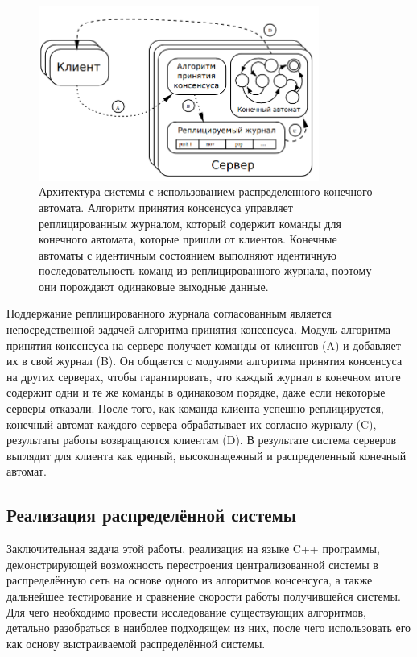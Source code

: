 \documentclass[subf, href, colorlinks=true, 14pt,
times, mtpro, specialist]{disser}
\theoremstyle{definition}
\begin{document}
\vspace{-0cm}
\begin{figure}[H]
\centering
\includegraphics[width=0.82\textwidth]{src/pics/state_machine.png}
\caption{Архитектура системы с использованием распределенного конечного автомата. Алгоритм принятия консенсуса управляет реплицированным журналом, который содержит команды для конечного автомата, которые пришли от клиентов. Конечные автоматы с идентичным состоянием выполняют идентичную последовательность команд из реплицированного журнала, поэтому они порождают одинаковые выходные данные.}
\label{fig:state_machine}
\end{figure}

Поддержание реплицированного журнала согласованным является непосредственной задачей алгоритма принятия консенсуса. Модуль алгоритма принятия консенсуса на сервере получает команды от клиентов
(A) и добавляет их в свой журнал (B). Он общается с модулями алгоритма принятия консенсуса на других серверах, чтобы гарантировать, что каждый журнал в конечном итоге содержит одни и те же команды в
одинаковом порядке, даже если некоторые серверы отказали. После того, как команда клиента успешно реплицируется, конечный автомат каждого сервера обрабатывает их согласно журналу (C), результаты работы возвращаются клиентам (D). В результате система серверов выглядит для клиента как единый, высоконадежный и распределенный конечный автомат.

\subsection{Реализация распределённой системы}

Заключительная задача этой работы, реализация на языке C++ программы, демонстрирующей возможность перестроения централизованной системы в распределённую сеть на основе одного из алгоритмов консенсуса, а также дальнейшее тестирование и сравнение скорости работы получившейся системы. Для чего необходимо провести исследование существующих алгоритмов, детально разобраться в наиболее подходящем из них, после чего использовать его как основу выстраиваемой распределённой системы.
\end{document}

